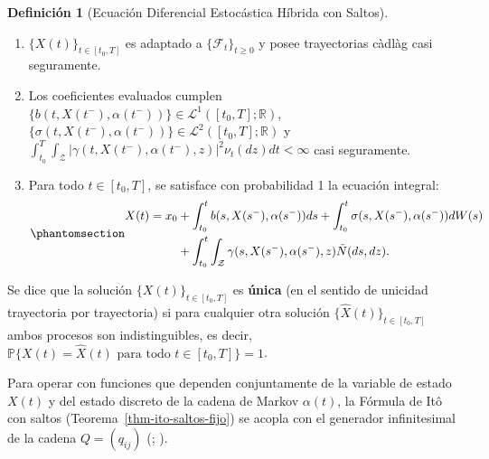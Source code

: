 \documentclass[
  spanish,
  us-letterpaper,
]{scrreprt}
\providecommand{\tightlist}{%
  \setlength{\itemsep}{0pt}\setlength{\parskip}{0pt}}
\numberwithin{equation}{section}
\theoremstyle{plain}
\theoremstyle{plain}
\theoremstyle{definition}
\newtheorem{definition}{Definición}[chapter]
\theoremstyle{plain}
\theoremstyle{remark}
\begin{document}
\begin{definition}[Ecuación Diferencial Estocástica Híbrida con
Saltos]
\begin{enumerate}
\def\labelenumi{\arabic{enumi}.}
\tightlist
\item
  \(\{X(t)\}_{t \in [t_0, T]}\) es adaptado a
  \(\{\mathcal{F}_t\}_{t \ge 0}\) y posee trayectorias càdlàg casi
  seguramente.
\item
  Los coeficientes evaluados cumplen
  \(\{b(t, X(t^-), \alpha(t^-))\} \in \mathcal{L}^1([t_0, T]; \mathbb{R})\),
  \(\{\sigma(t, X(t^-), \alpha(t^-))\} \in \mathcal{L}^2([t_0, T]; \mathbb{R})\)
  y
  \(\displaystyle \int_{t_0}^T \int_{\mathcal{Z}} \vert \gamma(t, X(t^-), \alpha(t^-), z) \vert^2 \nu_t(dz) dt < \infty\)
  casi seguramente.
\item
  Para todo \(t \in [t_0, T]\), se satisface con probabilidad 1 la
  ecuación integral:
  \begin{equation}\phantomsection\label{eq-ede-hibrida-int}{
  \begin{aligned}
  X(t) = x_0 &+ \int_{t_0}^t b(s, X(s^-), \alpha(s^-)) ds + \int_{t_0}^t \sigma(s, X(s^-), \alpha(s^-)) dW(s) \\
  &+ \int_{t_0}^t \int_{\mathcal{Z}} \gamma(s, X(s^-), \alpha(s^-), z) \tilde{N}(ds, dz).
  \end{aligned}
  }\end{equation}
\end{enumerate}

Se dice que la solución \(\{X(t)\}_{t \in [t_0, T]}\) es \textbf{única}
(en el sentido de unicidad trayectoria por trayectoria) si para
cualquier otra solución \(\{\widehat{X}(t)\}_{t \in [t_0, T]}\) ambos
procesos son indistinguibles, es decir,
\(\mathbb{P}\{X(t) = \widehat{X}(t) \text{ para todo } t \in [t_0, T]\} = 1\).

\end{definition}

Para operar con funciones que dependen conjuntamente de la variable de
estado \(X(t)\) y del estado discreto de la cadena de Markov
\(\alpha(t)\), la Fórmula de Itô con saltos
(Teorema~\ref{thm-ito-saltos-fijo}) se acopla con el generador
infinitesimal de la cadena \(Q = (q_{ij})\)
(;
).
\end{document}
